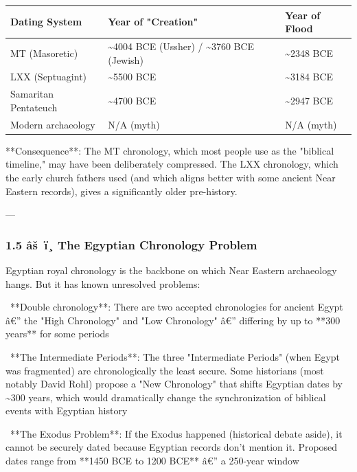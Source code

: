 \documentclass[aps,prd,11pt,onecolumn,superscriptaddress,nofootinbib,floatfix]{revtex4-2}
\begin{document}
\begin{table}[h!]
\centering
\begin{tabular}{p{3cm}p{3cm}p{3cm}}
\hline
Dating System & Year of "Creation" & Year of Flood \\
\hline
MT (Masoretic) & \textasciitilde{}4004 BCE (Ussher) / \textasciitilde{}3760 BCE (Jewish) & \textasciitilde{}2348 BCE \\
LXX (Septuagint) & \textasciitilde{}5500 BCE & \textasciitilde{}3184 BCE \\
Samaritan Pentateuch & \textasciitilde{}4700 BCE & \textasciitilde{}2947 BCE \\
Modern archaeology & N/A (myth) & N/A (myth) \\
\hline
\end{tabular}
\end{table}



**Consequence**: The MT chronology, which most people use as the "biblical timeline," may have been deliberately compressed. The LXX chronology, which the early church fathers used (and which aligns better with some ancient Near Eastern records), gives a significantly older pre-history.


---


\subsubsection{1.5 âš ï¸ The Egyptian Chronology Problem}


Egyptian royal chronology is the backbone on which Near Eastern archaeology hangs. But it has known unresolved problems:


\textbullet~**Double chronology**: There are two accepted chronologies for ancient Egypt â€'' the "High Chronology" and "Low Chronology" â€'' differing by up to **300 years** for some periods

\textbullet~**The Intermediate Periods**: The three "Intermediate Periods" (when Egypt was fragmented) are chronologically the least secure. Some historians (most notably David Rohl) propose a "New Chronology" that shifts Egyptian dates by \textasciitilde{}300 years, which would dramatically change the synchronization of biblical events with Egyptian history

\textbullet~**The Exodus Problem**: If the Exodus happened (historical debate aside), it cannot be securely dated because Egyptian records don't mention it. Proposed dates range from **1450 BCE to 1200 BCE** â€'' a 250-year window
\end{document}

